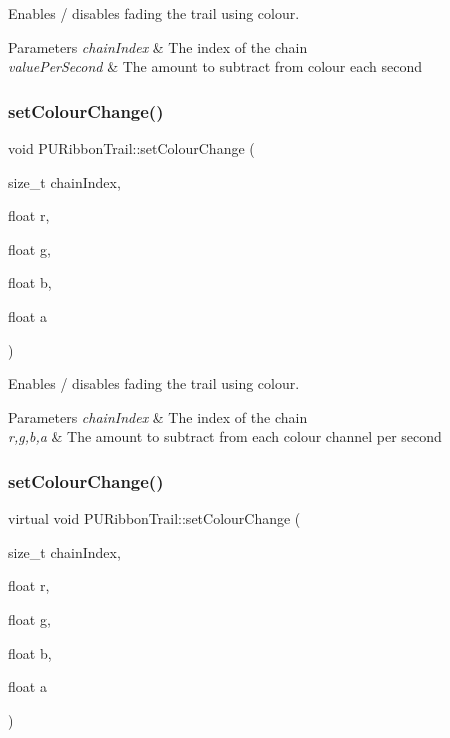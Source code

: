 Enables / disables fading the trail using colour. 
\begin{DoxyParams}{Parameters}
{\em chain\+Index} & The index of the chain \\
\hline
{\em value\+Per\+Second} & The amount to subtract from colour each second \\
\hline
\end{DoxyParams}
\mbox{\label{classPURibbonTrail_a7e97efa8ae300499c7de548705cd0873}} 
\subsubsection{\texorpdfstring{set\+Colour\+Change()}{setColourChange()}\hspace{0.1cm}{\footnotesize\ttfamily [3/4]}}
{\footnotesize\ttfamily void P\+U\+Ribbon\+Trail\+::set\+Colour\+Change (\begin{DoxyParamCaption}\item[{size\+\_\+t}]{chain\+Index,  }\item[{float}]{r,  }\item[{float}]{g,  }\item[{float}]{b,  }\item[{float}]{a }\end{DoxyParamCaption})\hspace{0.3cm}{\ttfamily [virtual]}}

Enables / disables fading the trail using colour. 
\begin{DoxyParams}{Parameters}
{\em chain\+Index} & The index of the chain \\
\hline
{\em r,g,b,a} & The amount to subtract from each colour channel per second \\
\hline
\end{DoxyParams}
\mbox{\label{classPURibbonTrail_ac344cbb2bf3277fe737c6152a2468832}} 
\subsubsection{\texorpdfstring{set\+Colour\+Change()}{setColourChange()}\hspace{0.1cm}{\footnotesize\ttfamily [4/4]}}
{\footnotesize\ttfamily virtual void P\+U\+Ribbon\+Trail\+::set\+Colour\+Change (\begin{DoxyParamCaption}\item[{size\+\_\+t}]{chain\+Index,  }\item[{float}]{r,  }\item[{float}]{g,  }\item[{float}]{b,  }\item[{float}]{a }\end{DoxyParamCaption})\hspace{0.3cm}{\ttfamily [virtual]}}

